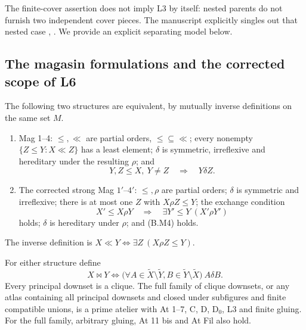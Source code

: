 The finite-cover assertion does not imply L3 by itself: nested parents
do not furnish two independent cover pieces. The manuscript explicitly
singles out that nested case
\citep[156-6, scan 65, marginal note]{Grothendieck1986},
.
We provide an explicit separating model below.

\subsection{The magasin formulations and the corrected scope of L6}

\begin{theorem}
\label{SA21-B-mag-equivalence}
The following two structures are equivalent, by mutually inverse
definitions on the same set \(M\).
\begin{enumerate}
\item Mag 1--4: \(\leq,\ll\) are partial orders,
\(\leq\subseteq\ll\); every nonempty
\(\{Z\leq Y:X\ll Z\}\) has a least element; \(\delta\) is symmetric,
irreflexive and hereditary under the resulting \(\rho\); and
\[
 Y,Z\leq X,\ Y\ne Z\quad\Longrightarrow\quad Y\delta Z.
                                                        \tag{B.M4}
\]
\item The corrected strong Mag \(1'\)--\(4'\): \(\leq,\rho\) are
partial orders; \(\delta\) is symmetric and irreflexive; there is at
most one \(Z\) with \(X\rho Z\leq Y\); the exchange condition
\[
 X'\leq X\rho Y\quad\Longrightarrow\quad
             \exists Y'\leq Y\ (X'\rho Y')             \tag{B.E}
\]
holds; \(\delta\) is hereditary under \(\rho\); and (B.M4) holds.
\end{enumerate}
The inverse definition is
\(X\ll Y\Longleftrightarrow\exists Z\ (X\rho Z\leq Y)\).

For either structure define
\[
 X\bowtie Y\Longleftrightarrow
 \bigl(\forall A\in\widetilde X\setminus\widetilde Y,
             B\in\widetilde Y\setminus\widetilde X\bigr)\ A\delta B.
                                                        \tag{B.MC}
\]
Every principal downset is a clique. The full family of clique downsets,
or any atlas containing all principal downsets and closed under
subfigures and finite compatible unions, is a prime atelier with
At 1--7, C, D, D\(_0\), L3 and finite gluing. For the full family,
arbitrary gluing, At 11 bis and At Fil also hold.
\end{theorem}

